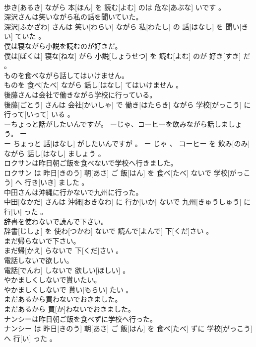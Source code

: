 \documentclass[8pt]{extreport}
\begin{document}
\begin{CJK}{UTF8}{min}
\\	歩き[あるき] ながら 本[ほん] を 読む[よむ] のは 危な[あぶな] いです 。
\\	深沢さんは笑いながら私の話を聞いていた。	
\\	深沢[ふかざわ] さんは 笑い[わらい] ながら 私[わたし] の 話[はなし] を 聞い[きい] ていた 。
\\	僕は寝ながら小説を読むのが好きだ。	
\\	僕は[ぼくは] 寝な[ねな] がら 小説[しょうせつ] を 読む[よむ] のが 好き[すき] だ 。
\\	ものを食べながら話してはいけません。	
\\	ものを 食べ[たべ] ながら 話し[はなし] てはいけません 。
\\	後藤さんは会社で働きながら学校に行っている。	
\\	後藤[ごとう] さんは 会社[かいしゃ] で 働き[はたらき] ながら 学校[がっこう] に 行って[いって] いる 。
\\	ーちょっと話がしたいんですが。 ーじゃ、コーヒーを飲みながら話しましょう。	ー
\\	ー ちょっと 話[はなし] がしたいんですが 。 ー じゃ 、 コーヒー を 飲み[のみ] ながら 話し[はなし] ましょう 。
\\	ロクサンは昨日朝ご飯を食べないで学校へ行きました。	
\\	ロクサン は 昨日[きのう] 朝[あさ] ご 飯[はん] を 食べ[たべ] ないで 学校[がっこう] へ 行き[いき] ました 。
\\	中田さんは沖縄に行かないで九州に行った。	
\\	中田[なかだ] さんは 沖縄[おきなわ] に 行か[いか] ないで 九州[きゅうしゅう] に 行[い] った 。
\\	辞書を使わないで読んで下さい。	
\\	辞書[じしょ] を 使わ[つかわ] ないで 読んで[よんで] 下[くだ]さい 。
\\	まだ帰らないで下さい。	
\\	まだ帰[かえ] らないで 下[くだ]さい 。
\\	電話しないで欲しい。	
\\	電話[でんわ] しないで 欲しい[ほしい] 。
\\	やかましくしないで貰いたい。	
\\	やかましくしないで 貰い[もらい] たい 。
\\	まだあるから買わないでおきました。	
\\	まだあるから 買[か]わないでおきました。
\\	ナンシーは昨日朝ご飯を食べずに学校へ行った。	
\\	ナンシー は 昨日[きのう] 朝[あさ] ご 飯[はん] を 食べ[たべ] ずに 学校[がっこう] へ 行[い] った 。

\end{CJK}
\end{document}
